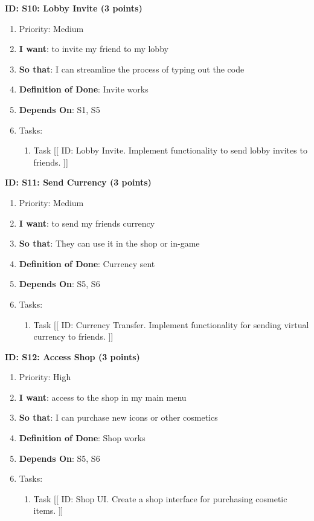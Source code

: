 \textbf{ID: S10: Lobby Invite (3 points)}
\begin{enumerate}
    \item Priority: Medium
    \item \textbf{I want}: to invite my friend to my lobby
    \item \textbf{So that}: I can streamline the process of typing out the code
    \item \textbf{Definition of Done}: Invite works
    \item \textbf{Depends On}: S1, S5
    \item Tasks:
    \begin{enumerate}
        \item Task [[ ID: Lobby Invite. Implement functionality to send lobby invites to friends. ]]
    \end{enumerate}
\end{enumerate}

\textbf{ID: S11: Send Currency (3 points)}
\begin{enumerate}
    \item Priority: Medium
    \item \textbf{I want}: to send my friends currency
    \item \textbf{So that}: They can use it in the shop or in-game
    \item \textbf{Definition of Done}: Currency sent
    \item \textbf{Depends On}: S5, S6
    \item Tasks:
    \begin{enumerate}
        \item Task [[ ID: Currency Transfer. Implement functionality for sending virtual currency to friends. ]]
    \end{enumerate}
\end{enumerate}

\textbf{ID: S12: Access Shop (3 points)}
\begin{enumerate}
    \item Priority: High
    \item \textbf{I want}: access to the shop in my main menu
    \item \textbf{So that}: I can purchase new icons or other cosmetics
    \item \textbf{Definition of Done}: Shop works
    \item \textbf{Depends On}: S5, S6
    \item Tasks:
    \begin{enumerate}
        \item Task [[ ID: Shop UI. Create a shop interface for purchasing cosmetic items. ]]
    \end{enumerate}
\end{enumerate}

